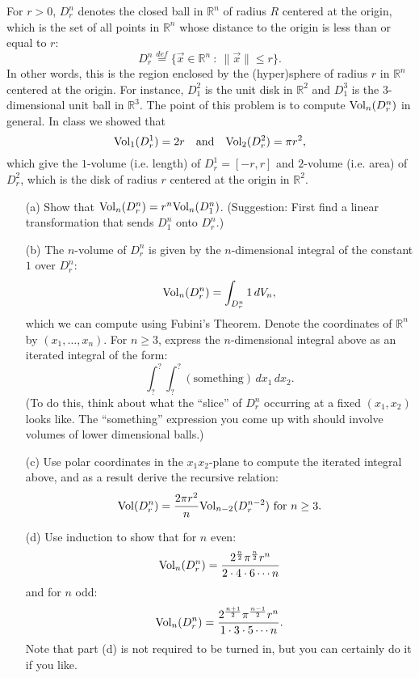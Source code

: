 \documentclass[11pt,letterpaper,cm]{nupset}
\begin{document}
\begin{problem}[Exercise 10]
	For $r>0$, $D_r^n$ denotes the closed ball in $\mathbb{R}^n$ of radius $R$ centered at the origin, which is the set of all points in $\mathbb{R}^n$ whose distance to the origin is less than or equal to $r$:
	\[ D_r^n \stackrel{def}{=} \{\vec{x} \in \mathbb{R}^n\ :\  \|\vec{x}\| \leq r\}. \]
	In other words, this is the region enclosed by the (hyper)sphere of radius $r$ in $\mathbb{R}^n$ centered at the origin. For instance, $D_1^2$ is the unit disk in $\mathbb{R}^2$ and $D_1^3$ is the $3$-dimensional unit ball in $\mathbb{R}^3$. The point of this problem is to compute ${\rm Vol}_n(D_r^n)$ in general. In class we showed that
	\[ {\rm Vol}_1(D_r^1) = 2r \quad\text{and}\quad {\rm Vol}_2(D_r^2) = \pi r^2, \]
	which give the $1$-volume (i.e. length) of $D_r^1 = [-r,r]$ and $2$-volume (i.e. area) of $D_r^2$, which is the disk of radius $r$ centered at the origin in $\mathbb{R}^2$.
\begin{itemize}
	\item[(a)] Show that ${\rm Vol}_n(D^n_r) = r^n{\rm Vol}_n(D^n_1)$. (Suggestion: First find a linear transformation that sends $D_1^n$ onto $D_r^n$.)
	\item[(b)] The $n$-volume of $D_r^n$ is given by the $n$-dimensional integral of the constant $1$ over $D_r^n$:
	\[ {\rm Vol}_n(D_r^n)=\int_{D_r^n} 1\,dV_n, \]
	which we can compute using Fubini's Theorem. Denote the coordinates of $\mathbb{R}^n$ by $(x_1,\ldots,x_n)$. For $n \geq 3$, express the $n$-dimensional integral above as an iterated integral of the form:
	\[ \int_?^?\int_?^? (\text{something})\,dx_1\,dx_2. \]
	(To do this, think about what the ``slice'' of $D_r^n$ occurring at a fixed $(x_1,x_2)$ looks like. The ``something'' expression you come up with should involve volumes of lower dimensional balls.)
	\item[(c)] Use polar coordinates in the $x_1x_2$-plane to compute the iterated integral above, and as a result derive the recursive relation:
	\[ {\rm Vol}(D_r^n) = \frac{2\pi r^2}n{\rm Vol}_{n-2}(D_r^{n-2}) \text{ for } n \ge 3. \]
	\item[(d)] Use induction to show that for $n$ even:
	\[ {\rm Vol}_n(D_r^n) = \frac{2^{\frac n2}\pi^{\frac n2}r^n}{2\cdot4\cdot6\cdots n} \]
	and for $n$ odd:
	\[ {\rm Vol}_n(D_r^n) = \frac{2^{\frac{n+1}2}\pi^{\frac{n-1}2}r^n}{1\cdot3\cdot5\cdots n}. \]
	Note that part (d) is not required to be turned in, but you can certainly do it if you like.
\end{itemize}
\end{problem}
\end{document}
